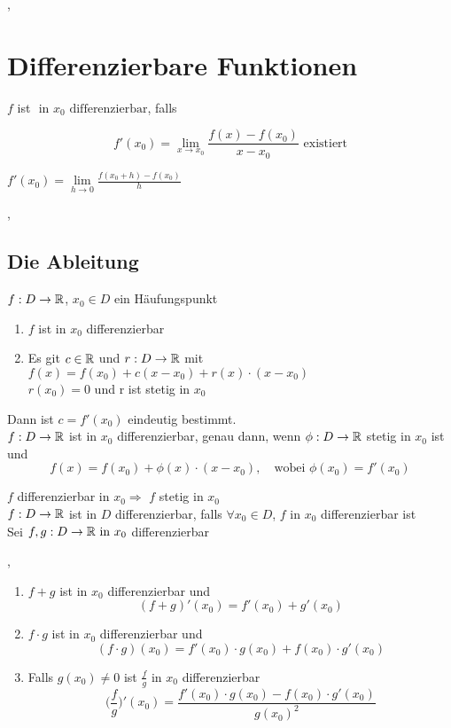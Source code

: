 \sep

\section{Differenzierbare Funktionen}


\Def[4.1.1] $f$ ist \textbf{${ \text{ in } x_0 \text{ differenzierbar}}$}, falls

\[ f'(x_0) = \lim\limits_{x \rightarrow x_0} \frac{f(x) - f(x_0)}{x - x_0} \text{ existiert} \]

\Bem $f'(x_0) = \lim\limits_{h \rightarrow 0} \frac{f(x_0 + h) - f(x_0)}{h}$

\sep
\subsection{Die Ableitung}

\Satz[4.1.3] $f: D \rightarrow \mathbb{R}$, $x_0 \in D$ ein Häufungspunkt
\begin{enumerate}
\item $f$ ist in $x_0$ differenzierbar
\item Es git $c \in \mathbb{R}$ und $r : D \rightarrow \mathbb{R}$ mit \\
$f(x) = f(x_0) + c(x - x_0) + r(x) \cdot (x - x_0)$ \\
$r(x_0) = 0$ und r ist stetig in $x_0$
\end{enumerate}
Dann ist $c = f'(x_0)$ eindeutig bestimmt. \\

\Satz[4.1.4] $f : D \rightarrow \mathbb{R}$ ist in $x_0$ differenzierbar, genau dann, wenn $\phi : D \rightarrow \mathbb{R}$ stetig in $x_0$ ist und
\[ f(x) = f(x_0) + \phi(x) \cdot (x - x_0), \quad \text{wobei } \phi(x_0) = f'(x_0) \]

\Korollar[4.1.5] $f$ differenzierbar in $x_0 \Rightarrow$ $f$ stetig in $x_0$ \\

\Def[4.1.7] $f: D \rightarrow \mathbb{R}$ ist in $D$ differenzierbar, falls $\forall x_0 \in D$, $f$ in $x_0$ differenzierbar ist  \\

\Satz[4.1.9] Sei $f, g : D \rightarrow  \mathbb{R} \text{ in } x_0$ differenzierbar

\sep

\begin{enumerate}
\item $f + g$ ist in $x_0$ differenzierbar und
\[ (f + g)'(x_0) = f'(x_0) + g'(x_0) \]
\item $f \cdot g$ ist in $x_0$ differenzierbar und
\[ (f \cdot g) (x_0) = f'(x_0) \cdot g(x_0) + f(x_0) \cdot g'(x_0) \]
\item Falls $g(x_0) \neq 0$ ist $ \frac{f}{g}$ in $x_0$ differenzierbar
\[ \bigg(\frac{f}{g} \bigg)' (x_0) = \frac{f'(x_0) \cdot g(x_0) - f(x_0) \cdot g'(x_0)}{g(x_0)^2} \]
\end{enumerate}

